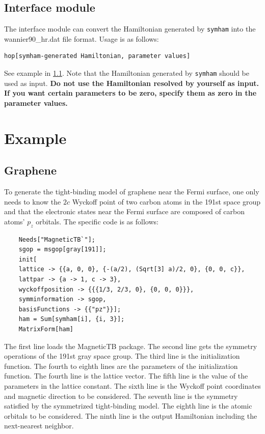 \documentclass[titlepage,a4paper,12pt,AutoFakeBold]{article}
\begin{document}
\subsection{Interface module}
The interface module can convert the Hamiltonian generated by \lstinline|symham| into the wannier90\_hr.dat file format. Usage is as follows:
\begin{lstlisting}[numbers=none]
	hop[symham-generated Hamiltonian, parameter values]
\end{lstlisting}
See example in \ref{gra}. Note that the Hamiltonian generated by \lstinline|symham| should be used as input. \textbf{Do not use the Hamiltonian resolved by yourself as input. If you want certain parameters to be zero, specify them as zero in the parameter values.}

\section{Example}
\subsection{Graphene}
\label{gra}
To generate the tight-binding model of graphene near the Fermi surface, one only needs to know the $2c$ Wyckoff point of two carbon atoms in the 191st space group and that the electronic states near the Fermi surface are composed of carbon atoms' $p_z$ orbitals.
The specific code is as follows:
\begin{lstlisting}
	Needs["MagneticTB`"];
	sgop = msgop[gray[191]];
	init[
	lattice -> {{a, 0, 0}, {-(a/2), (Sqrt[3] a)/2, 0}, {0, 0, c}},
	lattpar -> {a -> 1, c -> 3},
	wyckoffposition -> {{{1/3, 2/3, 0}, {0, 0, 0}}},
	symminformation -> sgop,
	basisFunctions -> {{"pz"}}];
	ham = Sum[symham[i], {i, 3}];
	MatrixForm[ham]
\end{lstlisting}
The first line loads the \textsf{MagneticTB} package. The second line gets the symmetry operations of the 191st gray space group. The third line is the initialization function. The fourth to eighth lines are the parameters of the initialization function. The fourth line is the lattice vector. The fifth line is the value of the parameters in the lattice constant. The sixth line is the Wyckoff point coordinates and magnetic direction to be considered. The seventh line is the symmetry satisfied by the symmetrized tight-binding model. The eighth line is the atomic orbitals to be considered. The ninth line is the output Hamiltonian including the next-nearest neighbor.
\end{document}
